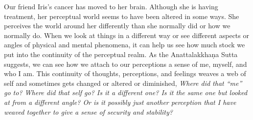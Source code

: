 Our friend Iris's cancer has moved to her brain. Although she is having 
treatment, her perceptual world seems to have been altered in some 
ways. She perceives the world around her differently than she normally 
did or how we normally do. When we look at things in a different way or 
see different aspects or angles of physical and mental phenomena, it 
can help us see how much stock we put into the continuity of the 
perceptual realm. As the Anattalakkhaṇa Sutta suggests, we can see 
how we attach to our perceptions a sense of me, myself, and who I am. 
This continuity of thoughts, perceptions, and feelings weaves a web of 
self and sometimes gets changed or altered or diminished, \emph{Where 
did that ``me'' go to? Where did that self go? Is it a different one? 
Is it the same one but looked at from a different angle? Or is it 
possibly just another perception that I have weaved together to give a 
sense of security and stability?}

